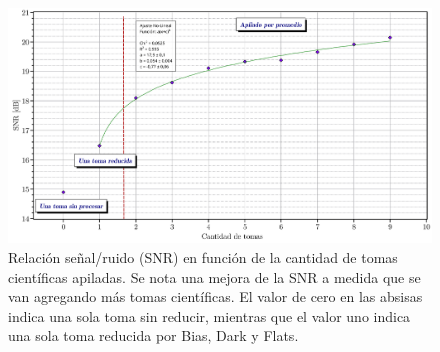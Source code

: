 \documentclass[a4paper, 12pt]{article}
\begin{document}
\begin{figure}[!h]
  \centering
  \includegraphics[width=\textwidth]{img/SNR.pdf}
  \caption{\label{fig:snr} Relación señal/ruido (SNR) en función de la cantidad de tomas científicas apiladas. Se nota una mejora de la SNR a medida que se van agregando más tomas científicas. El valor de cero en las absisas indica una sola toma sin reducir, mientras que el valor uno indica una sola toma reducida por Bias, Dark y Flats.}
\end{figure}



   
\end{document}
